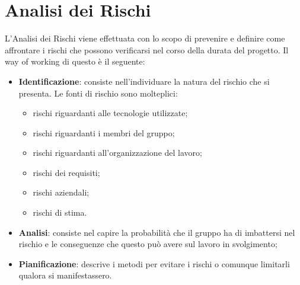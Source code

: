 \section{Analisi dei Rischi}
L'Analisi dei Rischi viene effettuata con lo scopo di prevenire e definire come affrontare i rischi 
che possono verificarsi nel corso della durata del progetto. Il way of working di questo  è il 
seguente:
\begin{itemize}
    \item \textbf{Identificazione}: consiste nell'individuare la natura del rischio che si presenta. Le fonti di rischio sono molteplici:
                                    \begin{itemize}
                                        \item rischi riguardanti alle tecnologie utilizzate;
                                        \item rischi riguardanti i membri del gruppo;
                                        \item rischi riguardanti all'organizzazione del lavoro;
                                        \item rischi dei requisiti;
                                        \item rischi aziendali;
                                        \item rischi di stima.
                                    \end{itemize}
    \item \textbf{Analisi}: consiste nel capire la probabilità che il gruppo ha di imbattersi nel rischio e le conseguenze che questo può avere sul lavoro in svolgimento;
    \item \textbf{Pianificazione}: descrive i metodi per evitare i rischi o comunque limitarli qualora si manifestassero.
\end{itemize}

